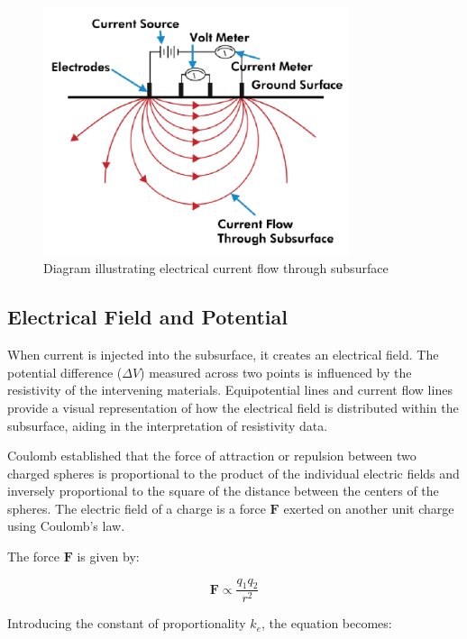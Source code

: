 \documentclass[12pt,a4paper]{report}
\begin{document}
\begin{figure}[H]
    \centering
    \includegraphics[width=0.8\textwidth]{current-flow.png}
    \caption{Diagram illustrating electrical current flow through subsurface}
\end{figure}

\subsection{Electrical Field and Potential}
When current is injected into the subsurface, it creates an electrical field. The potential difference ($\Delta V$) measured across two points is influenced by the resistivity of the intervening materials. Equipotential lines and current flow lines provide a visual representation of how the electrical field is distributed within the subsurface, aiding in the interpretation of resistivity data.

Coulomb established that the force of attraction or repulsion between two charged spheres is proportional to the product of the individual electric fields and inversely proportional to the square of the distance between the centers of the spheres. The electric field of a charge is a force \(\mathbf{F}\) exerted on another unit charge using Coulomb's law.

The force \(\mathbf{F}\) is given by:

\begin{equation}
\mathbf{F} \propto \frac{q_1 q_2}{r^2}
\end{equation}

Introducing the constant of proportionality \(k_e\), the equation becomes:
\end{document}
